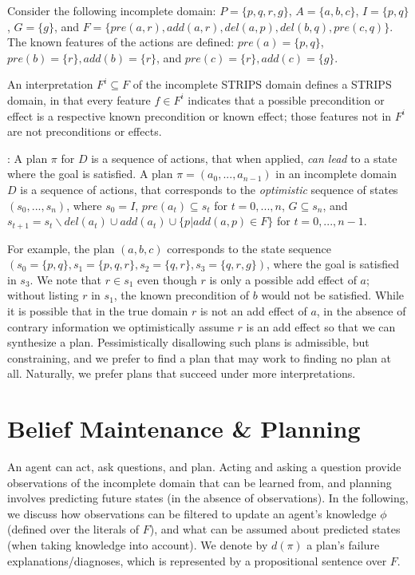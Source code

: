 \documentclass[letterpaper]{article}
\def\und#1{\noindent{\bf #1}:}
\begin{document}
Consider the following incomplete domain: $P = \{p, q, r, g\}$, ${A} =
\{{a}, {b}, {c}\}$, $I = \{p, q\}$,  $G= \{g\}$, and $F = \{pre(a, r), add(a, r),
del(a, p),del(b, q),pre(c, q) \}$.  The
known features of the actions are defined:  $pre({a}) = \{p, q\}$, $  pre({b}) =
\{r\},  add({b}) = \{r\}$, and  $ pre({c}) =
\{r\},  add({c}) = \{g\}$. 

An interpretation $F^i \subseteq F$ of the incomplete STRIPS domain
defines a STRIPS domain, in that every feature $f \in F^i$
indicates that a possible precondition or effect is a respective known
precondition or known effect; those features not in $F^i$ are
not preconditions or effects.   



\und{Incomplete STRIPS Plans} A plan $\pi$ for ${D}$ is a sequence of
actions, that when applied, {\em can lead} to a state where the goal is
satisfied.  A plan $\pi = ({a}_0,  ..., {a}_{n-1})$ in an incomplete
domain ${D}$ is a sequence of  actions, that corresponds to the {\em
optimistic} sequence of states $(s_0, ...,  s_n)$, where $s_0 = I$,
$pre({a}_t) \subseteq s_t$ for $t = 0,...,  n$, $G \subseteq s_n$,
and $s_{t+1} = s_t \backslash del({a}_t)  \cup
add({a}_t) \cup \{p | add(a, p) \in
F\}$ for $t = 0,...,
n-1$.

For example, the plan $({a}, {b}, {c})$ corresponds to the
state sequence $(s_0 = \{p, q\}, s_1 = \{p, q, r\}, s_2 = \{q, r\}, s_3 = \{q,
r, g\})$, where the goal is satisfied in $s_3$.  We note that $r \in s_1$ even
though $r$ is only a possible add effect of $a$; without listing $r$ in $s_1$,
the known precondition of $b$ would not be satisfied.  While it is possible that
in the true domain $r$ is not an add effect of $a$, in the absence of contrary
information we optimistically assume $r$ is an add effect so that we can
synthesize a plan.   Pessimistically disallowing such plans is admissible, but
constraining, and we prefer to find a plan that may work to finding no plan at
all.  Naturally, we prefer plans that succeed under more interpretations.

\section{Belief Maintenance \& Planning}

An agent can act, ask questions, and plan.  Acting and asking a question provide
observations of the incomplete domain that can be learned from, and planning
involves predicting future states (in the absence of observations).  In the following, we discuss how
observations can be filtered to update an agent's knowledge $\phi$ (defined over
the literals of $F$), and what can be assumed about predicted states
(when taking knowledge into account).  We denote by $d(\pi)$ a plan's failure
explanations/diagnoses, which is represented by a propositional sentence over
$F$.
\end{document}
